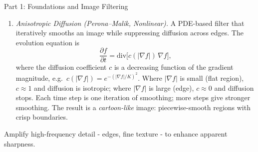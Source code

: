 \documentclass[letterpaper]{article}
\begin{document}
\begin{notes}{Part 1: Foundations and Image Filtering}
\begin{enumerate}
    or,
    
    $$g(x,y) = \frac{1}{W_p}\sum_{s}\sum_{t}G_{\sigma_s}(s,t)\,G_{\sigma_r}\!\bigl(f(x+s,y+t)-f(x,y)\bigr)f(x+s,y+t)\,$$
    
    where $G_{\sigma_s}$ is the spatial Gaussian (penalises distant pixels), $G_{\sigma_r}$ is the range Gaussian (penalises pixels with very different intensity), and $W_p$ is a normalisation constant. 

    $$W_p=\sum_{q\in S}G_{\sigma_s}\left( \Vert p -q \Vert \right)G_{\sigma_r}\left(|I_p - I_q|\right)$$
    
    Pixels across a strong edge have large intensity difference, so $G_{\sigma_r}\approx 0$ and they do not contribute - the edge is preserved. $\sigma_s$ controls the spatial smoothing radius; $\sigma_r$ controls sensitivity to intensity differences. Nonlinear and non-convolution; more expensive than Gaussian filtering.

    \item \textit{Anisotropic Diffusion (Perona--Malik, Nonlinear).} A PDE-based filter that iteratively smooths an image while suppressing diffusion across edges. The evolution equation is
    $$\frac{\partial f}{\partial t} = \mathrm{div}\!\bigl[c(|\nabla f|)\,\nabla f\bigr],$$
    where the diffusion coefficient $c$ is a decreasing function of the gradient magnitude, e.g.\ $c(|\nabla f|)=e^{-(|\nabla f|/K)^2}$. Where $|\nabla f|$ is small (flat region), $c\approx 1$ and diffusion is isotropic; where $|\nabla f|$ is large (edge), $c\approx 0$ and diffusion stops. Each time step is one iteration of smoothing; more steps give stronger smoothing. The result is a \emph{cartoon-like} image: piecewise-smooth regions with crisp boundaries.
\end{enumerate}



Amplify high-frequency detail - edges, fine texture - to enhance apparent sharpness.


\end{notes}
\end{document}
